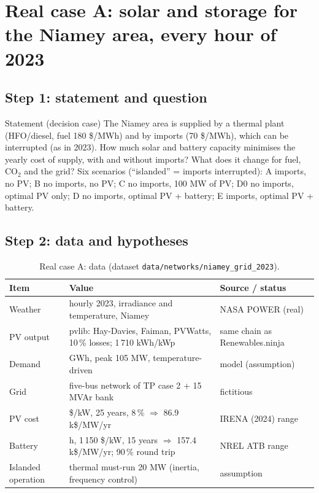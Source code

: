 \documentclass[11pt,a4paper]{article}
\begin{document}
\section{Real case A: solar and storage for the Niamey area, every hour of 2023}

\subsection{Step 1: statement and question}
\begin{gbox}{Statement (decision case)}
The Niamey area is supplied by a thermal plant (HFO/diesel, fuel 180 \$/MWh) and by imports (70 \$/MWh), which can be
interrupted (as in 2023). How much solar and battery capacity minimises the yearly cost of supply, with and without
imports? What does it change for fuel, CO$_2$ and the grid? Six scenarios (``islanded'' = imports interrupted): A imports, no PV; B no imports, no PV;
C no imports, 100 MW of PV; D0 no imports, optimal PV only; D no imports, optimal PV + battery; E imports, optimal PV + battery.
\end{gbox}

\subsection{Step 2: data and hypotheses}
\begin{table}[h]\centering\small
\caption{Real case A: data (dataset \texttt{data/networks/niamey\_grid\_2023}).}
\begin{tabularx}{\textwidth}{@{}l>{\raggedright\arraybackslash}X>{\raggedright\arraybackslash}p{3.6cm}@{}}
\toprule
Item & Value & Source / status \\
\midrule
Weather & hourly 2023, irradiance and temperature, Niamey & NASA POWER (real) \\
PV output & pvlib: Hay-Davies, Faiman, PVWatts, 10\,\% losses; 1\,710 kWh/kWp & same chain as Renewables.ninja \\
Demand & 726 GWh, peak 105 MW, temperature-driven & model (assumption) \\
Grid & five-bus network of TP case 2 + 15 MVAr bank & fictitious \\
PV cost & 800 \$/kW, 25 years, 8\,\% $\Rightarrow$ 86.9 k\$/MW/yr & IRENA (2024) range \\
Battery & 4 h, 1\,150 \$/kW, 15 years $\Rightarrow$ 157.4 k\$/MW/yr; 90\,\% round trip & NREL ATB range \\
Islanded operation & thermal must-run 20 MW (inertia, frequency control) & assumption \\
\bottomrule
\end{tabularx}
\end{table}
\end{document}
